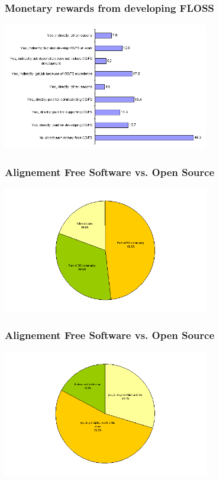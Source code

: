 \documentclass{beamer}
\begin{document}
\begin{frame}
\frametitle{Monetary rewards from developing FLOSS}

\begin{center}
\includegraphics[width=9cm]{figs/money.png}
\end{center}

\end{frame}


\begin{frame}
\frametitle{Alignement Free Software vs. Open Source}

\begin{center}
\includegraphics[width=9cm]{figs/FSvsOS.png}
\end{center}

\end{frame}


\begin{frame}
\frametitle{Alignement Free Software vs. Open Source}

\begin{center}
\includegraphics[width=9cm]{figs/FSvsOS2.png}
\end{center}

\end{frame}
\end{document}
